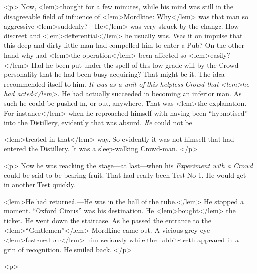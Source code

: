 {{				<p>
				Now, 
<lem>thought 
					{} 
				for a few minutes, while his mind was still in the disagreeable 
				field of influence of 
<lem>Mordkine: Why</lem>
					{} 
				was that man so aggressive 
<lem>suddenly?---He</lem> 
					{}
				was very 
				struck by the change. How discreet and 
<lem>defferential</lem>
				{} 
				he usually was. Was it on impulse 
				that this deep and dirty little man had compelled him to enter a Pub? On the other hand 
				why had 
<lem>the operation</lem>{} been affected so 
<lem>easily?</lem>
					{} 
				Had he been put under the spell of this 
				low-grade will by the Crowd-personality that he had been busy acquiring? That might be 
				it. The idea recommended itself to him. \emph{It was as a unit of this helpless Crowd 
				that 
<lem>he had acted</lem>{}.} 
				He had actually succeeded in becoming an inferior man. As such he could be pushed 
				in, or out, anywhere. That was 
<lem>the explanation. For instance</lem>
					{} 
				when he reproached himself with having been 
				“hypnotised” into the Distillery, evidently that was absurd. \emph{He} could not be 
				
<lem>treated in that</lem>
					{} 
				way. So evidently it was not himself that had entered the Distillery. It was a 
				sleep-walking Crowd-man. 
 				</p> 

				<p>
				Now he was reaching the stage---at last---when his \emph{Experiment with a Crowd} could be said 
				to be bearing fruit. That had really been Test No 1. He would get in another Test quickly. 
				 
<lem>He had returned.---He was in the hall of the tube.</lem>
					{} 
				He stopped a moment. “Oxford Circus” 
				was his destination. He 
<lem>bought</lem>
					{} 
				the ticket. He went down the staircase. As he passed 
				the entrance to the 
<lem>“Gentlemen”</lem>
					{} 
				Mordkine came out. A vicious grey eye 
<lem>fastened on</lem>{} him 
				seriously while the rabbit-teeth appeared in a grin of recognition. He smiled back. 
 				</p> 

				<p>
				
}}
